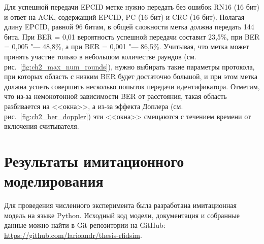 Для успешной передачи EPCID метке нужно передать без ошибок RN16 (16 бит) и ответ на ACK, содержащий EPCID, PC (16 бит) и CRC (16 бит). Полагая длину EPCID, равной 96 битам, в общей сложности метка должна передать 144 бита. При BER = 0,01 вероятность успешной передачи составит 23,5\%, при BER = 0,005 "--- 48,8\%, а при BER = 0,001 "--- 86,5\%. Учитывая, что метка может принять участие только в небольшом количестве раундов (см. рис.~\ref{fig:ch2_max_num_rounds}), нужно выбирать такие параметры протокола, при которых область с низким BER будет достаточно большой, и при этом метка должна успеть совершить несколько попыток передачи идентификатора. Отметим, что из-за немонотонной зависимости BER от расстояния, такая область разбивается на <<окна>>, а из-за эффекта Доплера (см. рис.~\ref{fig:ch2_ber_doppler}) эти <<окна>> смещаются с течением времени от включения считывателя.



\section{Результаты имитационного моделирования}\label{sec:ch2_results}
Для проведения численного эксперимента была разработана имитационная модель на языке Python. Исходный код модели, документация и собранные данные можно найти в Git-репозитории на GitHub: \url{https://github.com/larioandr/thesis-rfidsim}.

